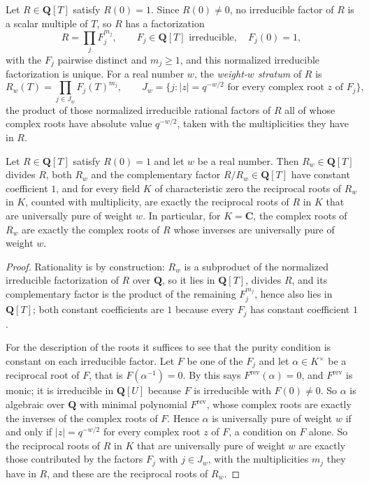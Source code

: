\begin{definition}
\label{def:zla-weight-stratum}
\leanok
Let $R\in\mathbf Q[T]$ satisfy $R(0)=1$.  Since $R(0)\neq0$, no irreducible
factor of $R$ is a scalar multiple of $T$, so $R$ has a factorization
\[
  R=\prod_{j}F_j^{m_j},
  \qquad
  F_j\in\mathbf Q[T]\text{ irreducible},\quad F_j(0)=1,
\]
with the $F_j$ pairwise distinct and $m_j\geq1$, and this normalized
irreducible factorization is unique.  For a real number $w$, the
\emph{weight-$w$ stratum} of $R$ is
\[
  R_w(T)=\prod_{j\in J_w}F_j(T)^{m_j},
  \qquad
  J_w=\{j:|z|=q^{-w/2}\text{ for every complex root }z\text{ of }F_j\},
\]
the product of those normalized irreducible rational factors of $R$ all of
whose complex roots have absolute value $q^{-w/2}$, taken with the
multiplicities they have in $R$.
\end{definition}

\begin{proposition}
\label{prop:zla-weight-stratum-rational}
Let $R\in\mathbf Q[T]$ satisfy $R(0)=1$ and let $w$ be a real number.  Then
$R_w\in\mathbf Q[T]$ divides $R$, both $R_w$ and the complementary factor
$R/R_w\in\mathbf Q[T]$ have constant coefficient $1$, and for every field $K$
of characteristic zero the reciprocal roots of $R_w$ in $K$, counted with
multiplicity, are exactly the reciprocal roots of $R$ in $K$ that are
universally pure of weight $w$.  In particular, for $K=\mathbf C$, the
complex roots of $R_w$ are exactly the complex roots of $R$ whose inverses are
universally pure of weight $w$.
\end{proposition}
\begin{proof}
Rationality is by construction: $R_w$ is a subproduct of the normalized
irreducible factorization of $R$ over $\mathbf Q$, so it lies in
$\mathbf Q[T]$, divides $R$, and its complementary factor is the product of
the remaining $F_j^{m_j}$, hence also lies in $\mathbf Q[T]$; both constant
coefficients are $1$ because every $F_j$ has constant coefficient $1$.

For the description of the roots it suffices to see that the purity condition
is constant on each irreducible factor.  Let $F$ be one of the $F_j$ and let
$\alpha\in K^\times$ be a reciprocal root of $F$, that is $F(\alpha^{-1})=0$.
By  this says $F^{\mathrm{rev}}(\alpha)=0$, and
$F^{\mathrm{rev}}$ is monic; it is irreducible in $\mathbf Q[U]$ because $F$
is irreducible with $F(0)\neq0$.  So $\alpha$ is algebraic over $\mathbf Q$
with minimal polynomial $F^{\mathrm{rev}}$, whose complex roots are exactly
the inverses of the complex roots of $F$.  Hence $\alpha$ is universally pure
of weight $w$ if and only if $|z|=q^{-w/2}$ for every complex root $z$ of $F$,
a condition on $F$ alone.  So the reciprocal roots of $R$ in $K$ that are
universally pure of weight $w$ are exactly those contributed by the factors
$F_j$ with $j\in J_w$, with the multiplicities $m_j$ they have in $R$, and
these are the reciprocal roots of $R_w$.
\end{proof}

